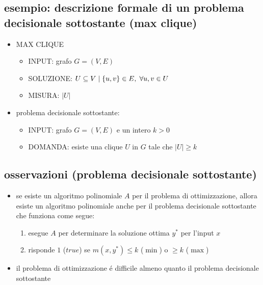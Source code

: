 \subsection*{esempio: descrizione formale di un problema decisionale sottostante (max clique)}
\begin{flushleft}
	\begin{itemize}
		\item MAX CLIQUE
		\begin{itemize}
			\item INPUT: grafo $G=(V,E)$
			\item SOLUZIONE: $U\subseteq V\hspace{0.1cm}\vert\hspace{0.1cm}\{u,v\}\in E,\hspace{0.1cm}\forall u,v\in U$
			\item MISURA: $|U|$
		\end{itemize}
		\item problema decisionale sottostante:
		\begin{itemize}
			\item INPUT: grafo $G=(V,E)$ e un intero $k>0$
			\item DOMANDA: esiste una clique $U$ in $G$ tale che $|U|\geq k$
		\end{itemize}
	\end{itemize}
\end{flushleft}


\subsection*{osservazioni (problema decisionale sottostante)}
\begin{flushleft}
	\begin{itemize}
		\item se esiste un algoritmo polinomiale $A$ per il problema di ottimizzazione, allora esiste un algoritmo polinomiale anche per il problema decisionale sottostante che funziona come segue:
			\begin{enumerate}
				\item esegue $A$ per determinare la soluzione ottima $y^*$ per l'input $x$
				\item risponde $1$ ($true$) se $m(x,y^*)\leq k$ ($\min$) o $\geq k$ ($\max$)
			\end{enumerate}
		\item il problema di ottimizzazione \'e difficile almeno quanto il problema decisionale sottostante
	\end{itemize}
\end{flushleft}

